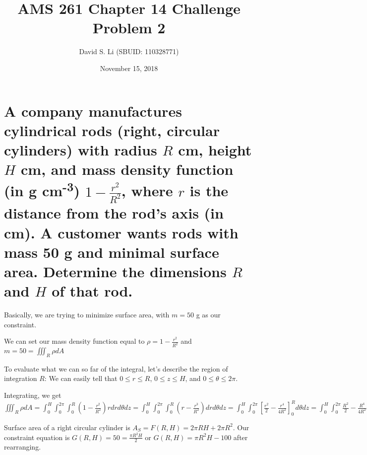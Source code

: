 \documentclass{article}
\title{AMS 261 Chapter 14 Challenge Problem 2}
\author{David S. Li (SBUID: 110328771)}
\date{November 15, 2018}
\begin{document}
\maketitle

\section{A company manufactures cylindrical rods (right, circular cylinders) with radius $R$ cm, height $H$ cm, and mass density function (in g cm\textsuperscript{-3}) $1 - \frac{r^{2}}{R^{2}}$, where $r$ is the distance from the rod's axis (in cm).  A customer wants rods with mass 50 g and minimal surface area.  Determine the dimensions $R$ and $H$ of that rod.}

\par\noindent\Large Basically, we are trying to minimize surface area, with $m = 50$ g as our constraint.\vspace{0.25cm}

\par\noindent\Large We can set our mass density function equal to $\rho = 1 - \frac{r^{2}}{R^{2}}$ and $m = 50 = \iiint_{R}\rho dA$\vspace{0.25cm}

\par\noindent\Large To evaluate what we can so far of the integral, let's describe the region of integration $R$: We can easily tell that $0 \leq r \leq R$, $0 \leq z \leq H$, and $0 \leq \theta \leq 2\pi$.\vspace{0.25cm}

\par\noindent\Large Integrating, we get $\iiint_{R}\rho dA = \int_{0}^{H}\int_{0}^{2\pi}\int_{0}^{R}(1 - \frac{r^{2}}{R^{2}})rdrd\theta dz = \int_{0}^{H}\int_{0}^{2\pi}\int_{0}^{R}(r - \frac{r^{3}}{R^{2}})drd\theta dz = \int_{0}^{H}\int_{0}^{2\pi}[\frac{r^{2}}{2} - \frac{r^{4}}{4R^{2}}]_{0}^{R}d\theta dz = \int_{0}^{H}\int_{0}^{2\pi}\frac{R^{2}}{2} - \frac{R^{4}}{4R^{2}}d\theta dz = \int_{0}^{H}\int_{0}^{2\pi}\frac{R^{2}}{2} - \frac{R^{2}}{4}d\theta dz = \int_{0}^{H}\int_{0}^{2\pi}\frac{R^{2}}{4}d\theta dz = \int_{0}^{H}\frac{R^{2}}{4}[\theta]_{0}^{2\pi}dz = \int_{0}^{H}\frac{R^{2}\pi}{2}dz = \frac{R^{2}\pi}{2}[z]_{0}^{H} = \frac{\pi R^{2}H}{2}$\vspace{0.25cm}

\par\noindent\Large Surface area of a right circular cylinder is $A_{S} = F(R, H) = 2\pi RH + 2\pi R^{2}$.  Our constraint equation is $G(R, H) = 50 = \frac{\pi R^{2}H}{2}$ or $G(R, H) = \pi R^{2}H - 100$ after rearranging.\vspace{0.25cm}
\end{document}
